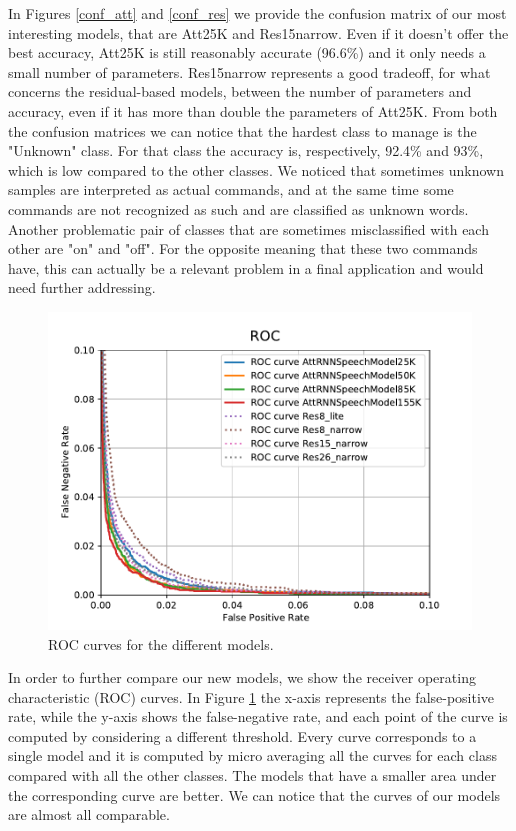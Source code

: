 In Figures \ref{conf_att} and \ref{conf_res} we provide the confusion matrix of our most interesting models, that are Att25K and Res15narrow. Even if it doesn't offer the best accuracy, Att25K is still reasonably accurate (96.6\%) and it only needs a small number of parameters.
Res15narrow represents a good tradeoff, for what concerns the residual-based models, between the number of parameters and accuracy, even if it has more than double the parameters of Att25K.
From both the confusion matrices we can notice that the hardest class to manage is the "Unknown" class.
For that class the accuracy is, respectively, 92.4\% and 93\%, which is low compared to the other classes. We noticed that sometimes unknown samples are interpreted as actual commands, and at the same time some commands are not recognized as such and are classified as unknown words. Another problematic pair of classes that are sometimes misclassified with each other are "on" and "off". For the opposite meaning that these two commands have, this can actually be a relevant problem in a final application and would need further addressing.


\begin{figure}[htbp]
\centerline{\includegraphics[scale=.5]{ROC.pdf}}
\caption{ROC curves for the different models.}
\label{roc}
\end{figure}

In order to further compare our new models, we show the receiver operating characteristic (ROC) curves. In Figure \ref{roc} the x-axis represents the false-positive rate, while the y-axis shows the false-negative rate, and each point of the curve is computed by considering a different threshold. Every curve corresponds to a single model and it is computed by micro averaging all the curves for each class compared with all the other classes. The models that have a smaller area under the corresponding curve are better. We can notice that the curves of our models are almost all comparable.
